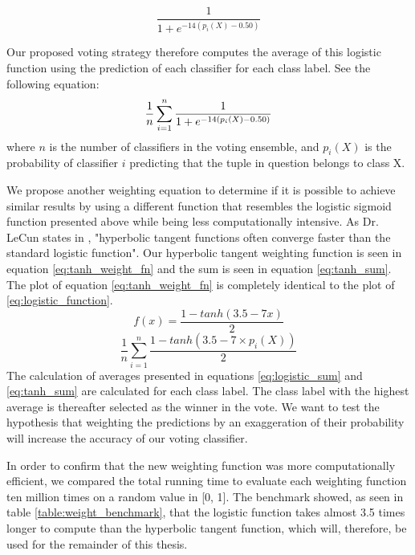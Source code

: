 \begin{equation}
\frac{1}{1+e^{-14(p_i(X)-0.50)}}
\label{eq:logistic_function_params}
\end{equation}

Our proposed voting strategy therefore computes the average of this logistic function using the prediction of each classifier for each class label. See the following equation:
\begin{equation}
\frac{1}{n}\sum_{i=1}^{n}\frac{1}{1+e^{-14(p_i(X)-0.50)}}\\ 
    \label{eq:logistic_sum}
\end{equation}
where $n$ is the number of classifiers in the voting ensemble, and $p_i(X)$ is the probability of classifier $i$ predicting that the tuple in question belongs to class X.

We propose another weighting equation to determine if it is possible to achieve similar results by using a different function that resembles the logistic sigmoid function presented above while being less computationally intensive. As Dr. LeCun states in \citep[10]{lecun2012efficient},  "hyperbolic tangent functions often converge faster than the standard logistic function".
Our hyperbolic tangent weighting function is seen in equation \ref{eq:tanh_weight_fn} and the sum is seen in equation \ref{eq:tanh_sum}. The plot of equation \ref{eq:tanh_weight_fn} is completely identical to the plot of \ref{eq:logistic_function}.
\begin{equation}
    f(x)=\frac{1-tanh(3.5-7x)}{2}
    \label{eq:tanh_weight_fn}
\end{equation}
\begin{equation}
\frac{1}{n}\sum_{i=1}^{n} \frac{1-tanh(3.5-7\times p_i(X))}{2}
    \label{eq:tanh_sum}
\end{equation}
The calculation of averages presented in equations \ref{eq:logistic_sum} and \ref{eq:tanh_sum} are calculated for each class label. The class label with the highest average is thereafter selected as the winner in the vote. We want to test the hypothesis that weighting the predictions by an exaggeration of their probability will increase the accuracy of our voting classifier.

In order to confirm that the new weighting function was more computationally efficient, we compared the total running time to evaluate each weighting function ten million times on a random value in [0, 1]. The benchmark showed, as seen in table \ref{table:weight_benchmark}, that the logistic function takes almost 3.5 times longer to compute than the hyperbolic tangent function, which will, therefore, be used for the remainder of this thesis.

